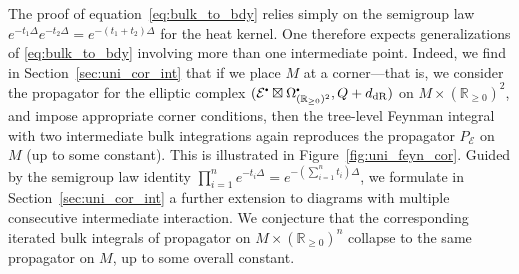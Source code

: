 \documentclass[11pt]{article}
\newcommand{\R}{\mathbb{R}}
\newcommand{\derham}{\mathrm{dR}}
\newcommand\sbullet[1][.5]{\mathbin{\vcenter{\hbox{\scalebox{#1}{$\bullet$}}}}}
\numberwithin{equation}{section}
\begin{document}
The proof of equation~\eqref{eq:bulk_to_bdy} relies simply on the semigroup law $e^{-t_1\Delta}e^{-t_2\Delta}=e^{-(t_1+t_2)\Delta}$ for the heat kernel. One therefore expects generalizations of \eqref{eq:bulk_to_bdy} involving more than one intermediate point. Indeed, we find in Section~\ref{sec:uni_cor_int} that if we place $M$ at a corner---that is, we consider the propagator for the elliptic complex $(\mathcal{E}^{\sbullet}\boxtimes\Omega^{\sbullet}_{(\R_{\geq 0})^2},Q +d_{\derham})$ on $M\times (\R_{\geq 0})^2$, and impose appropriate corner conditions, then the tree-level Feynman integral with two intermediate bulk integrations again reproduces the propagator $P_{\mathcal{E}}$ on $M$ (up to some constant). This is illustrated in Figure~\ref{fig:uni_feyn_cor}. Guided by the semigroup law identity  $\prod_{i = 1}^n e^{-t_i\Delta}=e^{-(\sum_{i =  1}^nt_i)\Delta}$, we formulate in Section~\ref{sec:uni_cor_int} a further extension to diagrams with multiple consecutive intermediate interaction. We conjecture that the corresponding iterated bulk integrals of propagator on $M\times (\R_{\geq 0})^n$ collapse to the same propagator on $M$, up to some overall constant.
\end{document}
